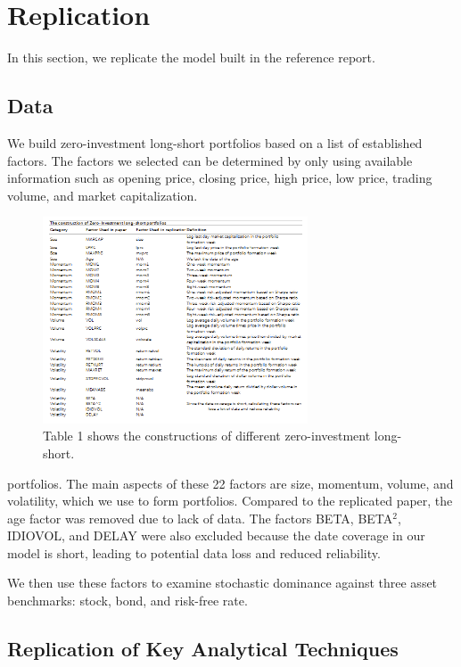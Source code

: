 \documentclass{article}
\begin{document}
\hypertarget{replication}{%
\section{Replication}\label{replication}}

In this section, we replicate the model built in the reference report.


\hypertarget{data}{%
\subsection{Data}\label{data}}

We build zero-investment long-short portfolios based on a list of established factors. The factors we selected can be determined by only using available information such as opening price, closing price, high price, low price, trading volume, and market capitalization.

\begin{figure}[h]
    \centering
    \includegraphics[width=0.7\textwidth]{1.png}
    \caption{Table 1 shows the constructions of different zero-investment long-short.} 
    \label{fig:example}
\end{figure}

portfolios. The main aspects of these 22 factors are size, momentum, volume, and volatility, which we use to form portfolios. Compared to the replicated paper, the age factor was removed due to lack of data. The factors BETA, BETA$^2$, IDIOVOL, and DELAY were also excluded because the date coverage in our model is short, leading to potential data loss and reduced reliability.

We then use these factors to examine stochastic dominance against three asset benchmarks: stock, bond, and risk-free rate.


\hypertarget{replication-of-key-analytical-techniques}{%
\subsection{Replication of Key Analytical
Techniques}\label{replication-of-key-analytical-techniques}}
\end{document}
